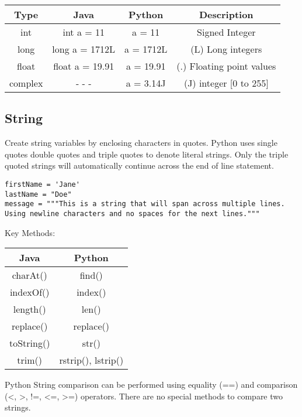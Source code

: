 \documentclass[a4paper,9pt]{extarticle}
\begin{document}
\begin{multicols*}{2}
\begin{center}
 \begin{tabular}{||c | c | c | c||}
 \hline
 Type & Java & Python & Description \\ [0.5ex]
 \hline\hline
 int & int a = 11 & a = 11 & Signed Integer\\
 \hline
 long & long a = 1712L & a = 1712L & (L) Long integers\\
 \hline
 float & float a = 19.91 & a = 19.91 & 	(.) Floating point values\\
 \hline
 complex & - - - & a = 3.14J & (J) integer [0 to 255]\\
 \hline
\end{tabular}
\end{center}

\newpage
\subsection{String}
Create string variables by enclosing characters in quotes. Python uses single quotes  double quotes  and triple quotes  to denote literal strings. Only the triple quoted strings  will automatically continue across the end of line statement.

\begin{lstlisting}
firstName = 'Jane'
lastName = "Doe"
message = """This is a string that will span across multiple lines. Using newline characters and no spaces for the next lines."""
\end{lstlisting}

Key Methods:
\begin{center}
 \begin{tabular}{||c | c||}
 \hline
 Java & Python\\ [1ex]
 \hline\hline
 charAt() & find()\\
 \hline
 indexOf() & index()\\
 \hline
 length() & len()\\
 \hline
replace() & replace()\\
 \hline
 toString() & str()\\
 \hline
 trim() & rstrip(), lstrip()\\
 \hline
\end{tabular}
\end{center}

Python String comparison can be performed using equality (==) and comparison (<, >, !=, <=, >=) operators. There are no special methods to compare two strings.


\end{multicols*}
\end{document}
